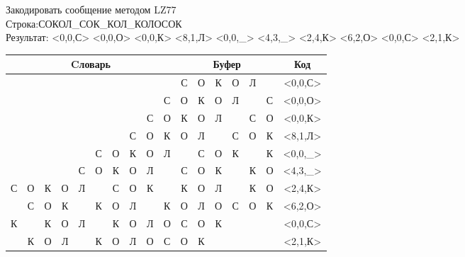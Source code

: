 \documentclass[a4paper, 12pt]{article}
\begin{document}
Закодировать сообщение методом LZ77\\
Строка:СОКОЛ\_СОК\_КОЛ\_КОЛОСОК\\
Результат: <0,0,С> <0,0,О> <0,0,К> <8,1,Л> <0,0,\_> <4,3,\_> <2,4,К> <6,2,О> <0,0,С> <2,1,К>\\
\begin{table}[h!]
\centering
\begin{tabular}{|c|c|c|c|c|c|c|c|c|c|c|c|c|c|c|c|c|} 
\hline
\multicolumn{10}{|c|}{Cловарь} & \multicolumn{6}{c|}{Буфер} & Код  \\ \hline
  &   &   &   &   &   &   &   &   &   & \cellcolor[HTML]{8CE4F6} С & О & К & О & Л &   & <0,0,С>
\\ \hline
  &   &   &   &   &   &   &   &   & С & \cellcolor[HTML]{8CE4F6} О & К & О & Л &   & С & <0,0,О>
\\ \hline
  &   &   &   &   &   &   &   & С & О & \cellcolor[HTML]{8CE4F6} К & О & Л &   & С & О & <0,0,К>
\\ \hline
  &   &   &   &   &   &   & С & \cellcolor[HTML]{FFFF00} О & К & \cellcolor[HTML]{FFFF00} О & \cellcolor[HTML]{8CE4F6} Л &   & С & О & К & <8,1,Л>
\\ \hline
  &   &   &   &   & С & О & К & О & Л & \cellcolor[HTML]{8CE4F6}   & С & О & К &   & К & <0,0,\_>
\\ \hline
  &   &   &   & \cellcolor[HTML]{FFFF00} С & \cellcolor[HTML]{FFFF00} О & \cellcolor[HTML]{FFFF00} К & О & Л &   & \cellcolor[HTML]{FFFF00} С & \cellcolor[HTML]{FFFF00} О & \cellcolor[HTML]{FFFF00} К & \cellcolor[HTML]{8CE4F6}   & К & О & <4,3,\_>
\\ \hline
С & О & \cellcolor[HTML]{FFFF00} К & \cellcolor[HTML]{FFFF00} О & \cellcolor[HTML]{FFFF00} Л & \cellcolor[HTML]{FFFF00}   & С & О & К &   & \cellcolor[HTML]{FFFF00} К & \cellcolor[HTML]{FFFF00} О & \cellcolor[HTML]{FFFF00} Л & \cellcolor[HTML]{FFFF00}   & \cellcolor[HTML]{8CE4F6} К & О & <2,4,К>
\\ \hline
  & С & О & К &   & К & \cellcolor[HTML]{FFFF00} О & \cellcolor[HTML]{FFFF00} Л &   & К & \cellcolor[HTML]{FFFF00} О & \cellcolor[HTML]{FFFF00} Л & \cellcolor[HTML]{8CE4F6} О & С & О & К & <6,2,О>
\\ \hline
К &   & К & О & Л &   & К & О & Л & О & \cellcolor[HTML]{8CE4F6} С & О & К &   &   &   & <0,0,С>
\\ \hline
  & К & \cellcolor[HTML]{FFFF00} О & Л &   & К & О & Л & О & С & \cellcolor[HTML]{FFFF00} О & \cellcolor[HTML]{8CE4F6} К &   &   &   &   & <2,1,К>
\\ \hline
\end{tabular}
\end{table}
\end{document}
